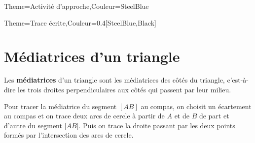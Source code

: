 \begin{Maquette}[Cours]{Theme={Activité d'approche},Couleur={SteelBlue}}
\begin{AActivite}
      \end{AActivite}

\end{Maquette}


\begin{Maquette}[Cours]{Theme={Trace écrite},Couleur={0.4[SteelBlue,Black]}}

   \section{Médiatrices d'un triangle}

      \begin{definition*}{}
         Les \textbf{médiatrices} d'un triangle sont les médiatrices des côtés du triangle, c'est-à-dire les trois droites perpendiculaires aux côtés qui passent par leur milieu.
      \end{definition*}

      Pour tracer la médiatrice du segment $[AB]$ au compas, on choisit un écartement au compas et on trace deux arcs de cercle à partir de $A$ et de $B$ de part et d'autre du segment [$AB]$. Puis on trace la droite passant par les deux points formés par l'intersection des arcs de cercle. \bigskip


\end{Maquette}
